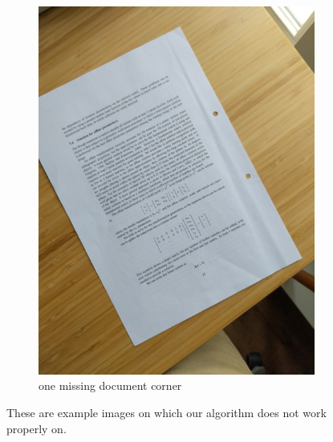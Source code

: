 \documentclass[bibliography=totoc]{scrartcl}
\begin{document}
\begin{figure}[H]
\begin{subfigure}[t]{0.3\linewidth}
		\includegraphics[width=\linewidth]{imgs/not_working/missing_corner.jpg}
		\caption{one missing document corner}
	\end{subfigure}
	\caption{These are example images on which our algorithm does not work properly on.}
	\label{fig:known_problems}
\end{figure}
\end{document}
